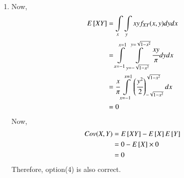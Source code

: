 \begin{enumerate}
\item
Now,
\begin{align}
    E{}\left[XY\right]&=\displaystyle\int\limits_{x}\displaystyle\int\limits_{y}xyf_{XY}(x,y)dydx\\
    &=\displaystyle\int\limits_{x=-1}^{x=1}\displaystyle\int\limits_{y=-\sqrt{1-x^2}}^{y=\sqrt{1-x^2}}\cfrac{xy}{\pi}dydx\\
    &=\cfrac{x}{\pi} \displaystyle\int\limits_{x=-1}^{x=1}\left(\cfrac{y^2}{2}\right)_{-\sqrt{1-x^2}}^{\sqrt{1-x^2}}dx\\
    &=0
\end{align}
Now,
\begin{align}
    Cov(X,Y)&=E{}\left[XY\right]-E{}\left[X\right]E{}\left[Y\right]\\
    &=0-E{}\left[X\right]\times0\\
    &=0
\end{align}
Therefore, option(4) is also correct.\\
\end{enumerate}